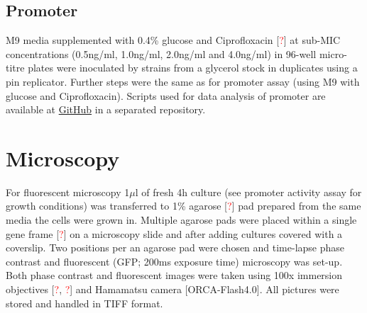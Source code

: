 \subsection{Promoter }
M9 media supplemented with 0.4\% glucose and Ciprofloxacin [\textcolor{red}{?}] at sub-MIC concentrations (0.5ng/ml, 1.0ng/ml, 2.0ng/ml and 4.0ng/ml) in 96-well micro-titre plates were inoculated by strains from a glycerol stock in duplicates using a pin replicator.
Further steps were the same as for  promoter assay (using M9 with glucose and Ciprofloxacin).
Scripts used for data analysis of  promoter are available at \href{https://github.com/marketavlkova/RecA}{GitHub} in a separated repository.


\section{Microscopy}
For fluorescent microscopy 1$\mu$l of fresh 4h culture (see promoter activity assay for growth conditions) was transferred to 1\% agarose [\textcolor{red}{?}] pad prepared from the same media the cells were grown in.
Multiple agarose pads were placed within a single gene frame [\textcolor{red}{?}] on a microscopy slide and after adding cultures covered with a coverslip.
Two positions per an agarose pad were chosen and time-lapse phase contrast and fluorescent (GFP; 200ms exposure time) microscopy was set-up.
Both phase contrast and fluorescent images were taken using 100x immersion objectives [\textcolor{red}{?}, \textcolor{red}{?}] and Hamamatsu camera [ORCA-Flash4.0].
All pictures were stored and handled in TIFF format.

\shorthandon{-} 
